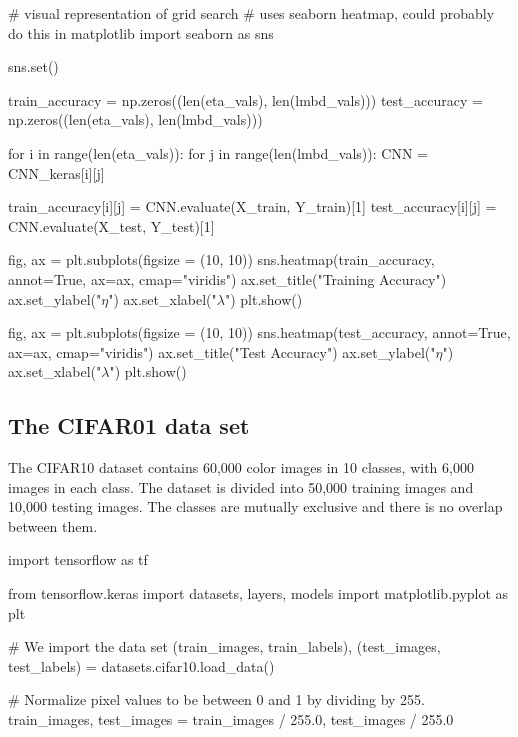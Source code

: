 \documentclass[%
oneside,                 %
final,                   %
10pt]{article}
\begin{document}
\bpycod
# visual representation of grid search
# uses seaborn heatmap, could probably do this in matplotlib
import seaborn as sns

sns.set()

train_accuracy = np.zeros((len(eta_vals), len(lmbd_vals)))
test_accuracy = np.zeros((len(eta_vals), len(lmbd_vals)))

for i in range(len(eta_vals)):
    for j in range(len(lmbd_vals)):
        CNN = CNN_keras[i][j]

        train_accuracy[i][j] = CNN.evaluate(X_train, Y_train)[1]
        test_accuracy[i][j] = CNN.evaluate(X_test, Y_test)[1]

        
fig, ax = plt.subplots(figsize = (10, 10))
sns.heatmap(train_accuracy, annot=True, ax=ax, cmap="viridis")
ax.set_title("Training Accuracy")
ax.set_ylabel("$\eta$")
ax.set_xlabel("$\lambda$")
plt.show()

fig, ax = plt.subplots(figsize = (10, 10))
sns.heatmap(test_accuracy, annot=True, ax=ax, cmap="viridis")
ax.set_title("Test Accuracy")
ax.set_ylabel("$\eta$")
ax.set_xlabel("$\lambda$")
plt.show()

\epycod


\subsection{The CIFAR01 data set}

The CIFAR10 dataset contains 60,000 color images in 10 classes, with
6,000 images in each class. The dataset is divided into 50,000
training images and 10,000 testing images. The classes are mutually
exclusive and there is no overlap between them.













\bpycod
import tensorflow as tf

from tensorflow.keras import datasets, layers, models
import matplotlib.pyplot as plt

# We import the data set
(train_images, train_labels), (test_images, test_labels) = datasets.cifar10.load_data()

# Normalize pixel values to be between 0 and 1 by dividing by 255. 
train_images, test_images = train_images / 255.0, test_images / 255.0


\epycod


\end{document}
